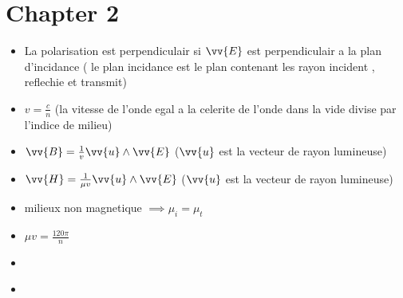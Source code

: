 \documentclass[12pt]{book}
\begin{document}
        \section*{Chapter 2}
            \begin{itemize}
            \item La polarisation est perpendiculair si $ \vv{E}  $ est perpendiculair a la plan d'incidance ( le plan incidance est le plan contenant les rayon incident , reflechie et transmit) 
            \item $v=\frac{c}{n}$ (la vitesse de l'onde egal a la celerite de l'onde dans la vide divise par l'indice de milieu)
            \item $ \vv{B} = \frac{1}{v} \vv{u}\wedge\vv{E} $ ($ \vv{u} $ est la vecteur de rayon lumineuse)
            \item $ \vv{H} = \frac{1}{\mu v}\vv{u}\wedge\vv{E} $ ($ \vv{u} $ est la vecteur de rayon lumineuse)
            \item milieux non magnetique $ \implies \mu_i = \mu_t $ 
            \item $ \mu v = \frac{120\pi}{n} $
            \item \begin{center}
                \end{center}
            \item \begin{center}
                \\
                \\
                \end{center}
        

\end{itemize}
\end{document}
